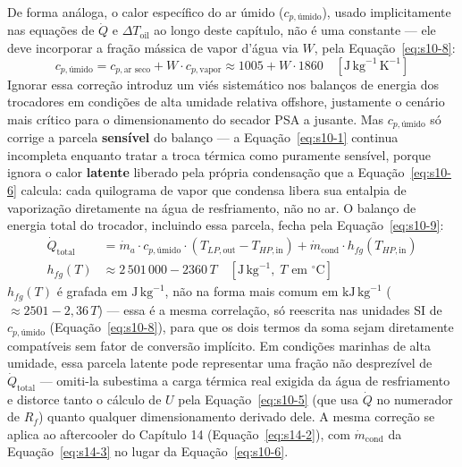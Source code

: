 \documentclass[12pt,a4paper]{article}
\numberwithin{equation}{section}
\numberwithin{table}{section}
\numberwithin{figure}{section}
\begin{document}
	De forma análoga, o calor específico do ar úmido ($c_{p,\text{úmido}}$), usado implicitamente nas equações de $\dot{Q}$ e $\Delta T_{\text{oil}}$ ao longo deste capítulo, não é uma constante — ele deve incorporar a fração mássica de vapor d'água via $W$, pela Equação~\eqref{eq:s10-8}:
	\begin{equation}\label{eq:s10-8}
 c_{p,\text{úmido}} = c_{p,\text{ar seco}} + W \cdot c_{p,\text{vapor}} \approx 1005 + W \cdot 1860 \quad [\text{J}\,\text{kg}^{-1}\,\text{K}^{-1}] 
\end{equation}
	Ignorar essa correção introduz um viés sistemático nos balanços de energia dos trocadores em condições de alta umidade relativa offshore, justamente o cenário mais crítico para o dimensionamento do secador PSA a jusante. Mas $c_{p,\text{úmido}}$ só corrige a parcela \textbf{sensível} do balanço — a Equação~\eqref{eq:s10-1} continua incompleta enquanto tratar a troca térmica como puramente sensível, porque ignora o calor \textbf{latente} liberado pela própria condensação que a Equação~\eqref{eq:s10-6} calcula: cada quilograma de vapor que condensa libera sua entalpia de vaporização diretamente na água de resfriamento, não no ar. O balanço de energia total do trocador, incluindo essa parcela, fecha pela Equação~\eqref{eq:s10-9}:
	\begin{equation}\label{eq:s10-9}
	\begin{aligned}
		\dot{Q}_{\text{total}} &= \dot{m}_a \cdot c_{p,\text{úmido}} \cdot (T_{LP,\text{out}} - T_{HP,\text{in}}) + \dot{m}_{\text{cond}} \cdot h_{fg}(T_{HP,\text{in}}) \\[4pt]
		h_{fg}(T) &\approx 2\,501\,000 - 2360 \, T \quad [\text{J}\,\text{kg}^{-1}, \; T \text{ em } ^{\circ}\text{C}]
	\end{aligned}
\end{equation}
	$h_{fg}(T)$ é grafada em $\text{J}\,\text{kg}^{-1}$, não na forma mais comum em $\text{kJ}\,\text{kg}^{-1}$ ($\approx 2501 - 2{,}36\,T$) — essa é a mesma correlação, só reescrita nas unidades SI de $c_{p,\text{úmido}}$ (Equação~\eqref{eq:s10-8}), para que os dois termos da soma sejam diretamente compatíveis sem fator de conversão implícito. Em condições marinhas de alta umidade, essa parcela latente pode representar uma fração não desprezível de $\dot{Q}_{\text{total}}$ — omiti-la subestima a carga térmica real exigida da água de resfriamento e distorce tanto o cálculo de $U$ pela Equação~\eqref{eq:s10-5} (que usa $\dot{Q}$ no numerador de $R_f$) quanto qualquer dimensionamento derivado dele. A mesma correção se aplica ao aftercooler do Capítulo 14 (Equação~\eqref{eq:s14-2}), com $\dot{m}_{\text{cond}}$ da Equação~\eqref{eq:s14-3} no lugar da Equação~\eqref{eq:s10-6}.
\end{document}
